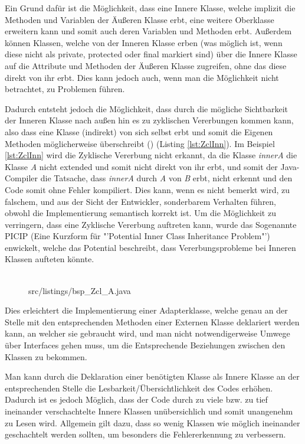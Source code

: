 Ein Grund dafür ist die Möglichkeit, dass eine Innere Klasse, welche implizit die Methoden und Variablen der Äußeren Klasse erbt, eine weitere Oberklasse erweitern kann und somit auch deren Variablen und Methoden erbt.
Außerdem können Klassen, welche von der Inneren Klasse erben (was möglich ist, wenn diese nicht als private, protected oder final markiert sind) über die Innere Klasse auf die Attribute und Methoden der Äußeren Klasse zugreifen, ohne das diese direkt von ihr erbt. Dies kann jedoch auch, wenn man die Möglichkeit nicht betrachtet, zu Problemen führen.

Dadurch entsteht jedoch die Möglichkeit, dass durch die mögliche Sichtbarkeit der Inneren Klasse nach außen hin es zu zyklischen Vererbungen kommen kann, also dass eine Klasse (indirekt) von sich selbst erbt und somit die Eigenen Methoden möglicherweise überschreibt (\cite{DBLP:journals/corr/abs-1301-6260}) (Listing \ref{lst:ZclInn}).
Im Beispiel \ref{lst:ZclInn}  wird die Zyklische Vererbung nicht erkannt, da die Klasse {\it innerA} die Klasse {\it A} nicht extended und somit nicht direkt von ihr erbt, und somit der Java-Compiler die Tatsache, dass {\it innerA} durch {\it A} von {\it B} erbt, nicht erkennt und den Code somit ohne Fehler kompiliert.
Dies kann, wenn es nicht bemerkt wird, zu falschem, und aus der Sicht der Entwickler, sonderbarem Verhalten führen, obwohl die Implementierung semantisch korrekt ist.
Um die Möglichkeit zu verringern, dass eine Zyklische Vererbung auftreten kann, wurde das Sogenannte PICIP (Eine Kurzform für "'Potential Inner Class Inheritance Problem"') enwickelt, welche das Potential beschreibt, dass Vererbungsprobleme bei Inneren Klassen aufteten könnte.
\\
\\
\begin{figure}[hbt]
\lstset{language=Java}
 {src/listings/bsp_Zcl_A.java}
\end{figure}
\newpage

Dies erleichtert die Implementierung einer Adapterklasse, welche genau an der Stelle mit den entsprechenden Methoden einer Externen Klasse deklariert werden kann,
 an welcher sie gebraucht wird, und man nicht notwendigerweise Umwege über Interfaces gehen muss, um die Entsprechende Beziehungen zwischen den Klassen zu bekommen.

Man kann durch die Deklaration einer benötigten Klasse als Innere Klasse an der entsprechenden Stelle die Lesbarkeit/Übersichtlichkeit des Codes erhöhen.
Dadurch ist es jedoch Möglich, dass der Code durch zu viele bzw. zu tief ineinander verschachtelte Innere Klassen unübersichlich und somit unangenehm zu Lesen wird.
Allgemein gilt dazu, dass so wenig Klassen wie möglich ineinander geschachtelt werden sollten, um besonders die Fehlererkennung zu verbessern.

